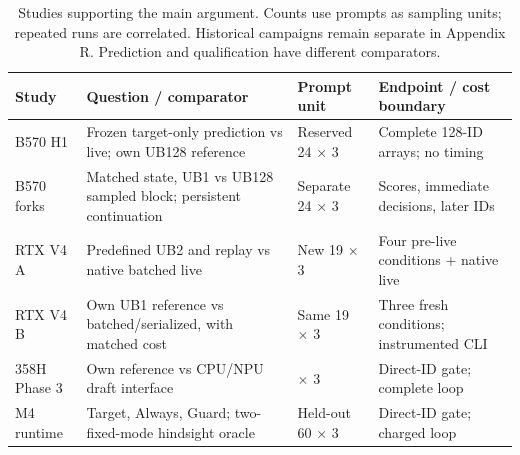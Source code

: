 \begin{table}[t]
\caption{Studies supporting the main argument. Counts use prompts as sampling units; repeated runs are correlated. Historical campaigns remain separate in Appendix R. Prediction and qualification have different comparators.}
\label{tab:studymap}
\centering
\begin{tabular}{@{}>{\raggedright\arraybackslash}p{1.12in}>{\raggedright\arraybackslash}p{2.20in}>{\raggedright\arraybackslash}p{1.03in}>{\raggedright\arraybackslash}p{1.65in}@{}}
\toprule
Study & Question / comparator & Prompt unit & Endpoint / cost boundary \\
\midrule
B570 H1 & Frozen target-only prediction vs live; own UB128 reference & Reserved 24 $\times$ 3 & Complete 128-ID arrays; no timing \\
B570 forks & Matched state, UB1 vs UB128 sampled block; persistent continuation & Separate 24 $\times$ 3 & Scores, immediate decisions, later IDs \\
RTX V4 A & Predefined UB2 and replay vs native batched live & New 19 $\times$ 3 & Four pre-live conditions + native live \\
RTX V4 B & Own UB1 reference vs batched/serialized, with matched cost & Same 19 $\times$ 3 & Three fresh conditions; instrumented CLI \\
358H Phase 3 & Own reference vs CPU/NPU draft interface & 30 $\times$ 3 & Direct-ID gate; complete loop \\
M4 runtime & Target, Always, Guard; two-fixed-mode hindsight oracle & Held-out 60 $\times$ 3 & Direct-ID gate; charged loop \\
\bottomrule
\end{tabular}
\end{table}
